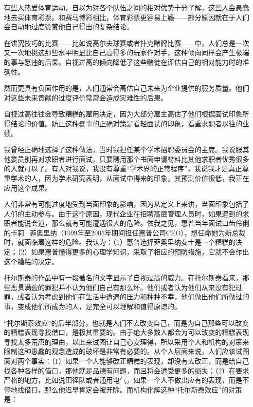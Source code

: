有些人热爱体育运动，自以为对各个队伍之间的相对优势十分了解，这些人会愚蠢地去买体育彩票。和赛马博彩相比，体育彩票更容易上瘾——部分原因就在于人们会自动地过度赞赏他自己得出的复杂结论。
\par

在讲究技巧的比赛——比如说高尔夫球赛或者扑克赌牌比赛——中，人们总是一次又一次地挑选那些水平明显比自己高得多的玩家作对手，这种倾向同样会产生极端的事与愿违的后果。自视过高的倾向降低了这些赌徒在评估自己的相对能力时的准确性。
\par

然而更具有负面作用的是，人们通常会高估自己未来为企业提供的服务质量。他们对这些未来贡献的过度评价常常会造成灾难性的后果。
\par

自视过高往往会导致糟糕的雇用决定，因为大部分雇主高估了他们根据面试印象所得结论的价值。防止这种蠢事的正确对策是看轻面试的印象，看重求职者以往的业绩。
\par

我曾经正确地选择了这种做法，当时我担任某个学术招聘委员会的主席。我说服其他委员别再对求职者进行面试，只要聘用那个书面申请材料比其他求职者优秀很多的人就可以了。有人对我说，我没有尊重“学术界的正常程序”，我说我才是真正尊重学术的人，因为学术研究表明，从面试中得来的印象，其预测价值很低，我正在应用这个成果。
\par

人们非常有可能过度地受到当面印象的影响，因为从定义上来讲，当面印象包括了人们的主动参与。由于这个原因，现代企业在招聘高层管理人员时，如果遇到的求职者能说会道，那么就有可能遭遇很大的危险。依我之见，惠普当年面试口齿伶俐的卡莉·菲奥里纳（1999年至2005年期间担任惠普公司CEO），想任命她为新总裁时，就面临着这样的危险。我认为：（1）惠普选择菲奥里纳女士是一个糟糕的决定；（2）如果惠普懂得更多的心理学知识，采取了相应的预防措施，它就不会作出这个糟糕的决定。
\par

托尔斯泰的作品中有一段著名的文字显示了自视过高的威力。在托尔斯泰看来，那些恶贯满盈的罪犯并不认为他们自己有那么坏。他们或者认为他们从来没有犯过罪，或者认为考虑到他们在生活中遭遇的压力和种种不幸，他们做出他们所做过的事，变成他们所成为的人，是完全可以理解和值得原谅的。
\par

“托尔斯泰效应”的后半部分，也就是人们不去改变自己，而是为自己那些可以改变的糟糕表现寻找借口，是极其重要的。由于绝大多数人都会为可以改变的糟糕表现寻找太多荒唐的理由，以此来试图让自己心安理得，所以采用个人和机构的对策来限制这种愚蠢的观念造成的破坏是非常有必要的。从个人层面来说，人们应该试图面对两个事实：（1）如果一个人能够改正糟糕的表现，却没有去改正，而是给自己找各种各样的借口，那他就是品德有问题，而且将会遭受更多的损失；（2）在要求严格的地方，比如说田径队或者通用电气，如果一个人不做出应有的表现，而是不停地找借口，那么他迟早肯定会被开除。而机构化解这种“托尔斯泰效应”的对策是：
\par

